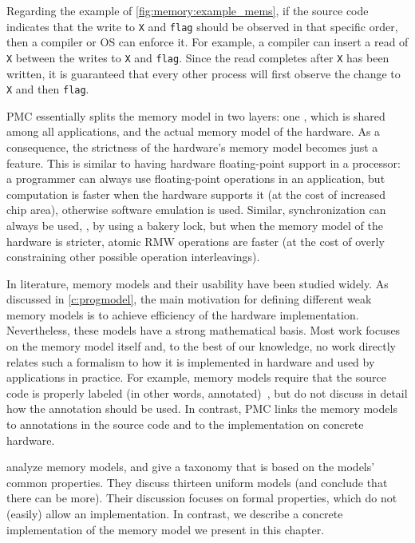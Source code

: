 Regarding the example of \vref{fig:memory:example_mems}, if the source code indicates that the write to \lstinline|X| and \lstinline|flag| should be observed in that specific order, then a compiler or \ac{OS} can enforce it.
For example, a compiler can insert a read of \lstinline|X| between the writes to \lstinline|X| and \lstinline|flag|.
Since the read completes after \lstinline|X| has been written, it is guaranteed that every other process will first observe the change to \lstinline|X| and then \lstinline|flag|.

\Ac{PMC} essentially splits the memory model in two layers: one , which is shared among all applications, and the actual memory model of the hardware.
As a consequence, the strictness of the hardware's memory model becomes just a feature.
This is similar to having hardware floating-point support in a processor: a programmer can always use floating-point operations in an application, but computation is faster when the hardware supports it (at the cost of increased chip area), otherwise software emulation is used.
Similar, synchronization can always be used, \eg, by using a bakery lock, but when the memory model of the hardware is stricter, atomic \ac{RMW} operations are faster (at the cost of overly constraining other possible operation interleavings).

In literature, memory models and their usability have been studied widely.
As discussed in \cref{c:progmodel}, the main motivation for defining different weak memory models is to achieve efficiency of the hardware implementation.
Nevertheless, these models have a strong mathematical basis.
Most work focuses on the memory model itself and, to the best of our knowledge, no work directly relates such a formalism to how it is implemented in hardware and used by applications in practice.
For example, memory models require that the source code is properly labeled (in other words, annotated)~\cite{gharachorloo:release_consistency}, but do not discuss in detail how the annotation should be used.
In contrast, \ac{PMC} links the memory models to annotations in the source code and to the implementation on concrete hardware.

 analyze memory models, and give a taxonomy that is based on the models' common properties.
They discuss thirteen uniform models (and conclude that there can be more). %
Their discussion focuses on formal properties, which do not (easily) allow an implementation.
In contrast, we describe a concrete implementation of the memory model we present in this chapter.


